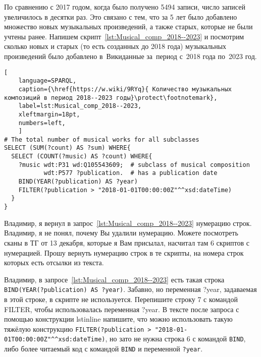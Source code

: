 По сравнению с 2017 годом, когда было получено \num{5494} записи, число записей увеличилось в десятки раз. Это связано с тем, что за 5 лет было добавлено множество новых музыкальных произведений, а также старых, которые не были учтены ранее.
Напишем скрипт~\ref{lst:Musical_comp_2018--2023} и посмотрим сколько новых и старых (то есть созданных до 2018 года) музыкальных произведений было добавлено в~Викиданные за~период с~2018 года по~2023 год.

\begin{lstlisting}[ 
    language=SPARQL,
    caption={\href{https://w.wiki/9RYq}{ Количество музыкальных композиций в период 2018--2023 годы}\protect\footnotemark},
    label=lst:Musical_comp_2018--2023,
    xleftmargin=18pt,
    numbers=left,
    ]
# The total number of musical works for all subclasses 
SELECT (SUM(?count) AS ?sum) WHERE{
  SELECT (COUNT(?music) AS ?count) WHERE{
    ?music wdt:P31 wd:Q105543609;  # subclass of musical composition
           wdt:P577 ?publication.  # has a publication date
    BIND(YEAR(?publication) AS ?year)
    FILTER(?publication > "2018-01-01T00:00:00Z"^^xsd:dateTime)
  }
}
\end{lstlisting}%

\TODO Владимир, я вернул в запрос~\ref{lst:Musical_comp_2018--2023} нумерацию строк. 
Владимир, я не понял, почему Вы удалили нумерацию. 
Можете посмотреть сканы в ТГ от 13 декабря, которые я Вам присылал, насчитал там 6 скриптов с нумерацией. 
Прошу вернуть нумерацию строк в те скрипты, на номера строк которых есть отсылки из текста. 

\TODO Владимир, в запросе~\ref{lst:Musical_comp_2018--2023} 
есть такая строка \lstinline|BIND(YEAR(?publication) AS ?year)|. 
Забавно, но переменная ?year, задаваемая в этой строке, в скрипте не используется. 
Перепишите строку 7 с командой FILTER, чтобы использовалась переменная ?year. 
В тексте после запроса с помощью конструкции lstinline напишите, что 
можно использовать такую тяжёлую конструкцию 
\lstinline|FILTER(?publication > "2018-01-01T00:00:00Z"^^xsd:dateTime)|, 
но зато не нужна строка 6 с командой \lstinline|BIND|, 
либо более читаемый код с командой \lstinline|BIND| и переменной \lstinline|?year|. 



